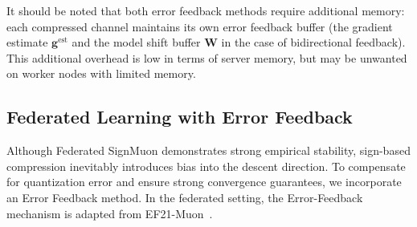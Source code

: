 \documentclass[letterpaper]{article} %
\begin{document}
It should be noted that both error feedback methods require additional memory: each compressed channel maintains its own error feedback buffer (the gradient estimate $\mathbf{g}^{\mathrm{est}}$ and the model shift buffer $\mathbf{W}$ in the case of bidirectional feedback). This additional overhead is low in terms of server memory, but may be unwanted on worker nodes with limited memory.

\subsection{Federated Learning with Error Feedback}
Although Federated SignMuon demonstrates strong empirical stability, sign-based compression inevitably introduces bias into the descent direction. To compensate for quantization error and ensure strong convergence guarantees, we incorporate an Error Feedback method. In the federated setting, the Error-Feedback mechanism is adapted from EF21-Muon~\cite{gruntkowska2025error}. 
\end{document}
